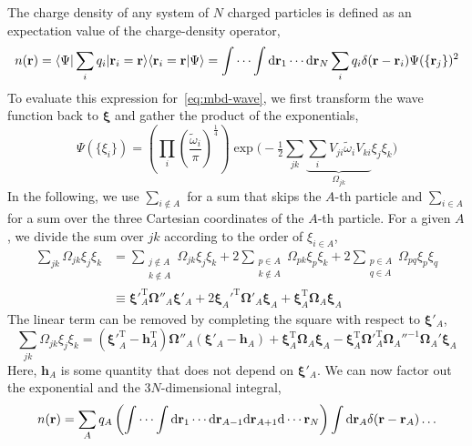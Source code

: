 The charge density of any system of $N$ charged particles is defined as an expectation value of the charge-density operator,
\begin{equation}
n(\mathbf r)=\langle\Psi|\sum_i q_i|\mathbf r_i=\mathbf r\rangle\langle\mathbf r_i=\mathbf r|\Psi\rangle=\idotsint\mathrm d\mathbf r_1\cdots\mathrm d\mathbf r_N\sum_i q_i\delta(\mathbf r-\mathbf r_i)\Psi(\{\mathbf r_j\})^2
\label{eq:density}
\end{equation}
To evaluate this expression for~\eqref{eq:mbd-wave}, we first transform the wave function back to $\boldsymbol\xi$ and gather the product of the exponentials,
\begin{equation}
\Psi(\{\xi_i\})=\left(\prod_i\left(\frac{\tilde\omega_i}{\pi}\right)^\frac14\right)\exp\Bigg(-\tfrac12\sum_{jk}\underbrace{\sum_i V_{ji}\tilde\omega_i V_{ki}}_{\Omega_{jk}}\xi_j\xi_k\Bigg)
\label{eq:wavefnc}
\end{equation}
In the following, we use $\sum_{i\notin A}$ for a sum that skips the $A$-th particle and $\sum_{i\in A}$ for a sum over the three Cartesian coordinates of the $A$-th particle.
For a given $A$, we divide the sum over $jk$ according to the order of $\xi_{i\in A}$,
\begin{equation}
\begin{aligned}
\sum_{jk}\Omega_{jk}\xi_j\xi_k&=\sum_{\substack{j\notin A\\k\notin A}}\Omega_{jk}\xi_j\xi_k+2\sum_{\substack{p\in A\\k\notin A}}\Omega_{pk}\xi_p\xi_k+2\sum_{\substack{p\in A\\q\in A}}\Omega_{pq}\xi_p\xi_q \\
&\equiv\boldsymbol\xi'^{\mathrm T}_A\boldsymbol\Omega''_A\boldsymbol\xi'_A+2\boldsymbol\xi_A'^{\mathrm T}\boldsymbol\Omega'_A\boldsymbol\xi_A+\boldsymbol\xi_A^{\mathrm T}\boldsymbol\Omega_A\boldsymbol\xi_A
\end{aligned}
\end{equation}
The linear term can be removed by completing the square with respect to $\boldsymbol\xi'_A$,
\begin{equation}
\sum_{jk}\Omega_{jk}\xi_j\xi_k=({\boldsymbol\xi'}^{\mathrm T}_A-\mathbf h_A^{\mathrm T})\boldsymbol\Omega''_A(\boldsymbol\xi'_A-\mathbf h_A)+\boldsymbol\xi_A^{\mathrm T}\boldsymbol\Omega_A\boldsymbol\xi_A-\boldsymbol\xi_A^{\mathrm T}\boldsymbol\Omega'^{\mathrm T}_A\boldsymbol\Omega_A''^{-1}\boldsymbol\Omega_A'\boldsymbol\xi_A
\label{eq:completesq}
\end{equation}
Here, $\mathbf h_A$ is some quantity that does not depend on $\boldsymbol\xi'_A$.
We can now factor out the exponential and the $3N$-dimensional integral,
\begin{equation}
n(\mathbf r)=\sum_A q_A\left(\idotsint\mathrm d\mathbf r_1\cdots\mathrm d\mathbf r_{A-1}\mathrm d\mathbf r_{A+1}\mathrm d\cdots\mathbf r_N\right)\int\mathrm d\mathbf r_A\delta(\mathbf r-\mathbf r_A)\ldots
\end{equation}

